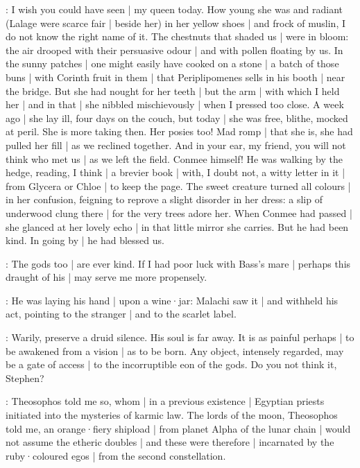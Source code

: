 \lynch:
I wish you could have seen |
my queen today.
How young she was and radiant
(Lalage were scarce fair |
beside her)
in her yellow shoes |
and frock of muslin,
I do not know the right name of it.
The chestnuts that shaded us |
were in bloom:
the air drooped with their persuasive odour |
and with pollen floating by us.
In the sunny patches |
one might easily have cooked on a stone |
a batch of those buns |
with Corinth fruit in them |
that Periplipomenes sells in his booth |
near the bridge.
But she had nought for her teeth |
but the arm |
with which I held her |
and in that |
she nibbled mischievously |
when I pressed too close.
A week ago |
she lay ill,
four days on the couch,
but today |
she was free,
blithe,
mocked at peril.
She is more taking then.
Her posies too!
Mad romp |
that she is,
she had pulled her fill |
as we reclined together.
And in your ear,
my friend,
you will not think who met us |
as we left the field.
Conmee himself!
He was walking by the hedge,
reading,
I think |
a brevier book |
with,
I doubt not,
a witty letter in it |
from Glycera or Chloe |
to keep the page.
The sweet creature turned all colours |
in her confusion,
feigning to reprove a slight disorder in her dress:
a slip of underwood clung there |
for the very trees adore her.
When Conmee had passed |
she glanced at her lovely echo |
in that little mirror she carries.
But he had been kind.
In going by |
he had blessed us.

\lenehan:
The gods too |
are ever kind.
If I had poor luck with Bass's mare |
perhaps this draught of his |
may serve me more propensely.

:
He was laying his hand |
upon a wine·jar:
Malachi saw it |
and withheld his act,
pointing to the stranger |
and to the scarlet label.

\mulligan:
 Warily,
preserve a druid silence.
His soul is far away.
It is as painful perhaps |
to be awakened from a vision |
as to be born.
Any object,
intensely regarded,
may be a gate of access |
to the incorruptible eon of the gods.
Do you not think it,
Stephen?

\stephen:
Theosophos told me so,
whom |
in a previous existence |
Egyptian priests initiated into the mysteries of karmic law.
The lords of the moon,
Theosophos told me,
an orange·fiery shipload |
from planet Alpha of the lunar chain |
would not assume the etheric doubles |
and these were therefore |
incarnated by the ruby·coloured egos |
from the second constellation.

